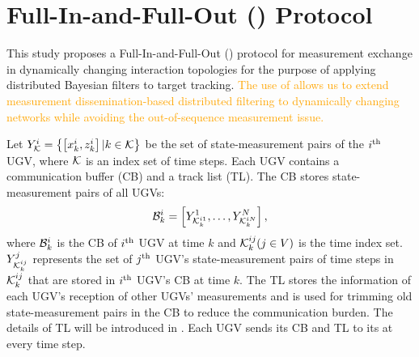 \section{Full-In-and-Full-Out (\proto) Protocol}\label{sec:\proto}		
	This study proposes a Full-In-and-Full-Out (\proto) protocol for measurement exchange in dynamically changing interaction topologies for the purpose of applying distributed Bayesian filters to target tracking.
	\textcolor{orange}{The use of {\proto} allows us to extend measurement dissemination-based distributed filtering to dynamically changing networks while avoiding the out-of-sequence measurement issue.}

	Let \small$Y^i_{\mathcal{K}}=\left\lbrace \left[x^i_k,z^i_k\right]|k\in \mathcal{K}\right\rbrace$\normalsize 
	be the set of state-measurement pairs of the $i^\text{th}$ UGV, where $\mathcal{K}$ is an index set of time steps.
	Each UGV contains a communication buffer (CB) and a track list (TL). 
	The CB stores state-measurement pairs 
	of all UGVs:
	\small\begin{equation*}		
		\mathcal{B}^i_k=\left[ Y^1_{\mathcal{K}^{i1}_k},\dots,Y^N_{\mathcal{K}^{iN}_k}\right],
	\end{equation*}\normalsize
	where $\mathcal{B}^i_k$ is the CB of $i^\text{th}$ UGV at time $k$ and $\mathcal{K}^{ij}_k (j\in V)$ is the time index set.
	$Y^j_{\mathcal{K}^{ij}_k}$ represents the set of $j^\text{th}$ UGV's state-measurement pairs of time steps in $\mathcal{K}^{ij}_k$ that are stored in $i^\text{th}$ UGV's CB at time $k$.	
	The TL stores the information of each UGV's reception of other UGVs' measurements and is used for trimming old state-measurement pairs in the CB to reduce the communication burden.
	The details of TL will be introduced in .
	Each UGV sends its CB and TL to its {\onbhd} at every time step.
	

